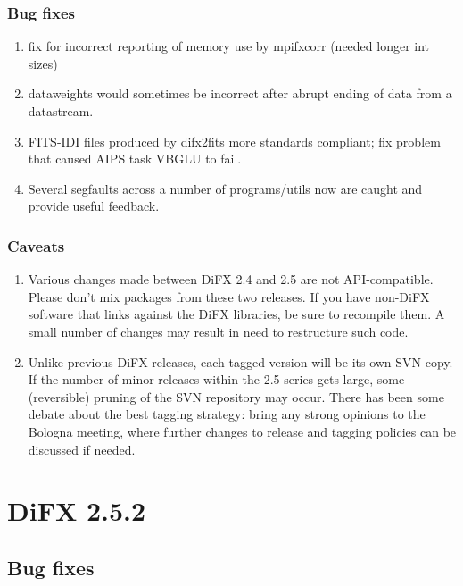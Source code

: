 \subsubsection{Bug fixes}

\begin{enumerate}

\item fix for incorrect reporting of memory use by mpifxcorr (needed longer int sizes)
\item dataweights would sometimes be incorrect after abrupt ending of data from a datastream.
\item FITS-IDI files produced by difx2fits more standards compliant; fix problem that caused AIPS task VBGLU to fail.
\item Several segfaults across a number of programs/utils now are caught and provide useful feedback. 

\end{enumerate}

\subsubsection{Caveats}

\begin{enumerate}

\item Various changes made between DiFX 2.4 and 2.5 are not API-compatible. Please don't mix packages from these two releases.  If you have non-DiFX software that links against the DiFX libraries, be sure to recompile them. A small number of changes may result in need to restructure such code.
\item Unlike previous DiFX releases, each tagged version will be its own SVN copy. If the number of minor releases within the 2.5 series gets large, some (reversible) pruning of the SVN repository may occur.  There has been some debate about the best tagging strategy: bring any strong opinions to the Bologna meeting, where further changes to release and tagging policies can be discussed if needed.

\end{enumerate}


\section{DiFX 2.5.2}

\subsection{Bug fixes}

